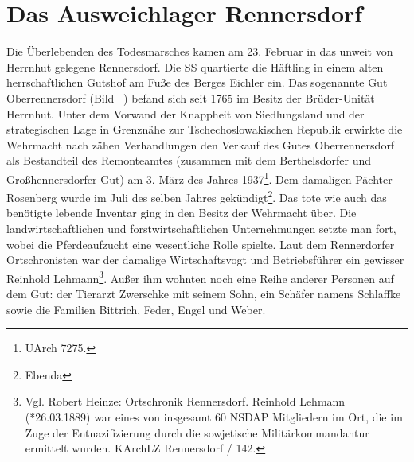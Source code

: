  \section{Das Ausweichlager Rennersdorf}

Die Überlebenden des Todesmarsches kamen am 23. Februar in das unweit von Herrnhut gelegene Rennersdorf. Die SS quartierte die Häftling in einem alten herrschaftlichen Gutshof am Fuße des Berges Eichler ein.
Das sogenannte Gut Oberrennersdorf (Bild ~) befand sich seit 1765 im Besitz der Brüder-Unität Herrnhut.
Unter dem Vorwand der Knappheit von Siedlungsland und der strategischen Lage in Grenz\-nähe zur Tschechoslowakischen Republik erwirkte die Wehrmacht nach zähen Verhandlungen den Verkauf des Gutes Oberrennersdorf als Bestandteil des Remonteamtes (zusammen mit dem Berthelsdorfer und Großhennersdorfer Gut) am 3. März des Jahres 1937\footnote{UArch 7275.}. Dem damaligen Pächter Rosenberg wurde im Juli des selben Jahres gekündigt\footnote{Ebenda}. 
Das tote wie auch das benötigte lebende Inventar ging in den Besitz der Wehrmacht über. Die landwirtschaftlichen und forstwirtschaftlichen Unternehmungen setzte man fort, wobei die Pferdeaufzucht eine wesentliche Rolle spielte. 
Laut dem Rennerdorfer Ortschronisten war der damalige Wirtschaftsvogt und Betriebsführer ein gewisser Reinhold Lehmann\footnote{Vgl. Robert Heinze: Ortschronik Rennersdorf. Reinhold Lehmann (*26.03.1889) war eines von insgesamt 60 NSDAP Mitgliedern im Ort, die im Zuge der Entnazifizierung durch die sowjetische Militärkommandantur ermittelt wurden. KArchLZ Rennersdorf / 142. }. Außer ihm wohnten noch eine Reihe anderer Personen auf dem Gut: der Tierarzt Zwerschke mit seinem Sohn, ein Schäfer namens Schlaffke sowie die Familien Bittrich, Feder, Engel und Weber. 

